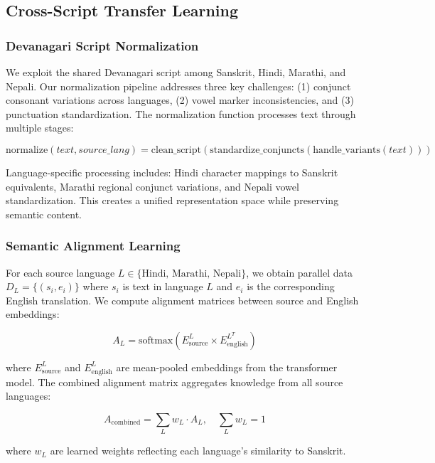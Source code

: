 \documentclass[runningheads]{llncs}
\begin{document}
\subsection{Cross-Script Transfer Learning}

\subsubsection{Devanagari Script Normalization}
We exploit the shared Devanagari script among Sanskrit, Hindi, Marathi, and Nepali. Our normalization pipeline addresses three key challenges: (1) conjunct consonant variations across languages, (2) vowel marker inconsistencies, and (3) punctuation standardization. The normalization function processes text through multiple stages:

\begin{equation}
\text{normalize}(text, source\_lang) = \text{clean\_script}(\text{standardize\_conjuncts}(\text{handle\_variants}(text)))
\end{equation}

Language-specific processing includes: Hindi character mappings to Sanskrit equivalents, Marathi regional conjunct variations, and Nepali vowel standardization. This creates a unified representation space while preserving semantic content.

\subsubsection{Semantic Alignment Learning}
For each source language $L \in \{\text{Hindi, Marathi, Nepali}\}$, we obtain parallel data $D_L = \{(s_i, e_i)\}$ where $s_i$ is text in language $L$ and $e_i$ is the corresponding English translation. We compute alignment matrices between source and English embeddings:

\begin{equation}
A_L = \text{softmax}(E_{\text{source}}^L \times E_{\text{english}}^{L^T})
\end{equation}

where $E_{\text{source}}^L$ and $E_{\text{english}}^L$ are mean-pooled embeddings from the transformer model. The combined alignment matrix aggregates knowledge from all source languages:

\begin{equation}
A_{\text{combined}} = \sum_{L} w_L \cdot A_L, \quad \sum_{L} w_L = 1
\end{equation}

where $w_L$ are learned weights reflecting each language's similarity to Sanskrit.
\end{document}
